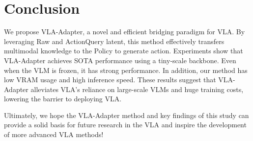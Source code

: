 \section{Conclusion}\label{sec5}

We propose VLA-Adapter, a novel and efficient bridging paradigm for VLA. By leveraging Raw and ActionQuery latent, this method effectively transfers multimodal knowledge to the Policy to generate action.
Experiments show that VLA-Adapter achieves SOTA performance using a tiny-scale backbone. Even when the VLM is frozen, it has strong performance. 
In addition, our method has low VRAM usage and high inference speed.
These results suggest that VLA-Adapter alleviates VLA's reliance on large-scale VLMs and huge training costs, lowering the barrier to deploying VLA.

Ultimately, we hope the VLA-Adapter method and key findings of this study can provide a solid basis for future research in the VLA and inspire the development of more advanced VLA methods!
